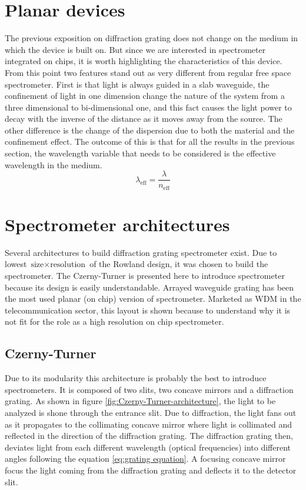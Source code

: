 \documentclass[12pt,twoside,english]{book}
\renewcommand{\~}{\perispomeni}%
\numberwithin{equation}{section}
\numberwithin{figure}{section}
\begin{document}
\section{Planar devices}

The previous exposition on diffraction grating does not change on the medium in which the device is built on. But since we are interested in spectrometer integrated on chips, it is worth highlighting the characteristics of this device. From this point two features stand out as very different from regular free space spectrometer. First is that light is always guided in a slab waveguide, the confinement of light in one dimension change the nature of the system from a three dimensional to bi-dimensional one, and this fact causes the light power to decay with the inverse of the distance as it moves away from the source. The other difference is the change of the dispersion due to both the material and the confinement effect. The outcome of this is that for all the results in the previous section, the wavelength variable that needs to be considered is the effective wavelength in the medium.
\begin{equation}
\lambda_{\text{eff}}=\frac{\lambda}{n_{\text{eff}}}\end{equation}
\section{Spectrometer architectures}

Several architectures to build diffraction grating spectrometer exist. Due to lowest $\text{size}\times \text{resolution}$ of the Rowland design, it was chosen to build the spectrometer. The Czerny-Turner is presented here to introduce spectrometer because its design is easily understandable. Arrayed waveguide grating has been the most used planar (on chip) version of spectrometer. Marketed as \gls{WDM} in the telecommunication sector, this layout is shown because to understand why it is not fit for the role as a high resolution on chip spectrometer. 

\subsection{Czerny-Turner}
\label{sub:Czerny-Turner}

Due to its modularity this architecture is probably the best to introduce spectrometers. It is composed of two slits, two concave mirrors and a diffraction grating. As shown in figure \ref{fig:Czerny-Turner-architecture}, the light to be analyzed is shone through the entrance slit. Due to diffraction, the light fans out as it propagates to the collimating concave mirror where light is collimated and reflected in the direction of the diffraction grating. The diffraction grating then, deviates light from each different wavelength (optical frequencies) into different angles following the equation \ref{eq:grating equation}. A focusing concave mirror focus the light coming from the diffraction grating and deflects it to the detector slit.
\end{document}

